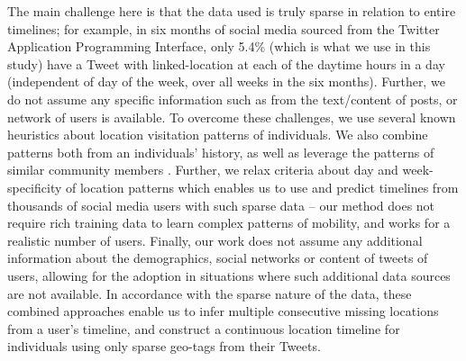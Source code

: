 The main challenge here is that the data used is truly sparse in relation to entire timelines; for example, in six months of social media sourced from the Twitter Application Programming Interface, only 5.4\% (which is what we use in this study) have a Tweet with linked-location at each of the daytime hours in a day (independent of day of the week, over all weeks in the six months). Further, we do not assume any specific information such as from the text/content of posts, or network of users is available. 
To overcome these challenges, we use several known heuristics about location visitation patterns of individuals. We also combine patterns both from an individuals' history, as well as leverage the patterns of similar community members \cite{jurgens2015geolocation,104,139}. Further, we relax criteria about day and week-specificity of location patterns which enables us to use and predict timelines from thousands of social media users with such sparse data -- our method does not require rich training data to learn complex patterns of mobility, and works for a realistic number of users. Finally, our work does not assume any additional information about the demographics, social networks or content of tweets of users, allowing for the adoption in situations where such additional data sources are not available. In accordance with the sparse nature of the data, these combined approaches enable us to infer multiple consecutive missing locations from a user's timeline, and construct a continuous location timeline for individuals using only sparse geo-tags from their Tweets. 

